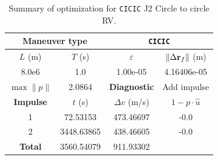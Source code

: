\begin{table}[htpb]
    \centering
    \begin{tabular}{cccc} \toprule
    \multicolumn{2}{c}{\textbf{Maneuver type}} & \multicolumn{2}{c}{\texttt{CICIC}} \\ \midrule
    \(L\) (m) & \(T\) (s) & \(\varepsilon\) & \(\lVert \Delta \mathbf{r}_{f} \rVert\) (m)    \\ \midrule
    8.0e6          & 1.0          & 1.00e-05                & 4.16406e-05                        \\ \midrule
    \(\max \lVert p \rVert\) & 2.0864     & \textbf{Diagnostic}   & Add impulse        \\ \midrule
    \textbf{Impulse} & \(t\) (s) & \(\Delta v\) (m/s) & \(1 - p \cdot \hat{u}\) \\ \midrule
    1                 & 72.53153          & 473.46697             & -0.0                    \\
    2                 & 3448.63865          & 438.46605             & -0.0                    \\\midrule
    \textbf{Total}   & 3560.54079          & 911.93302             &                     \\ \bottomrule   
    \end{tabular}
    \caption{Summary of optimization for \texttt{CICIC} J2 Circle to circle RV.}
    \label{tab:J2_ctcr_CICIC_tab}
\end{table}

